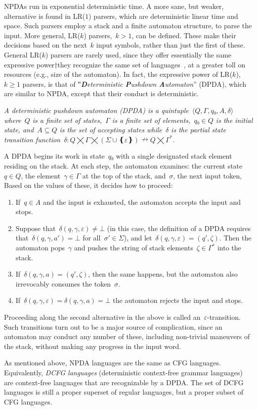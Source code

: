 NPDAs run in exponential deterministic time.
 A more sane, but weaker, alternative is found in LR($1$) parsers,
  which are deterministic linear time and space.
Such parsers employ a stack and a finite automaton structure,
  to parse the input.
 More general, LR($k$) parsers,~$k>1$, can be defined. These make their
 decisions based on the next~$k$ input symbols, rather than just the first of these.
 General LR($k$) parsers are rarely used, since they offer essentially
 the same expressive power†{they recognize the same set of languages~\cite{Knuth:65}},
 at a greater toll on resources (e.g., size of the automaton).
In fact, the expressive power of LR($k$),~$k\ge1$ parsers, is that
 of ‟\emph{\textbf Deterministic \textbf Pushdown \textbf Automaton}” (DPDA),
  which are similar to NPDA, except that their conduct is deterministic.

\begin{Definition}
  \label{Definition:DPDA}
  \slshape
  A \emph{deterministic pushdown automaton} (DPDA) is a quintuple~$⟨Q,Γ,q₀,A,δ⟩$
  where~$Q$ is a finite set of \emph{states},~$Γ$ is a finite
  \emph{set of elements},~$q₀∈Q$ is the initial state,
  and~$A⊆Q$ is the \emph{set of accepting states} while~$δ$ is
  the \emph{partial state transition function}~$δ:Q⨉Γ⨉(Σ∪❴ε❵)↛Q⨉Γ^*$.
  \par
  A DPDA begins its work in state~$q₀$ with a single designated stack element residing on the stack.
  At each step, the automaton examines: the current state~$q∈Q$, 
  the element~$γ∈Γ$ at the top of the stack, and~$σ$, the next input token, 
  Based on the values of these, it decides how to proceed:
  \begin{enumerate}
    \item If~$q∈A$ and the input is exhausted, the automaton accepts the input and stops.
    \item Suppose that~$δ(q,γ,ε)≠⊥$ (in this case, the definition of a DPDA
          requires that~$δ(q,γ,a')=⊥$ for all~$σ'∈Σ$), and let~$δ(q,γ,ε)=(q',ζ)$.
          Then the automaton pops~$γ$ and pushes the string of stack
          elements~$ζ∈Γ^*$ into the stack.
    \item If~$δ(q,γ,a)=(q',ζ)$, then the same happens, but the automaton also
          irrevocably consumes the token~$σ$.
    \item If~$δ(q,γ,ε)=δ(q,γ,a)=⊥$ the automaton rejects the input and stops.
  \end{enumerate}
\end{Definition}
Proceeding along the second alternative in the above is called an~$ε$-transition.
Such transitions turn out to be a major source of complication, 
  since an automaton may conduct any number of these, including non-trivial 
  maneuvers of the stack, without making any progress in the input word.
  
As mentioned above, NPDA languages are the same as CFG languages.
Equivalently, \emph{DCFG languages} (deterministic context-free grammar languages)
  are context-free languages that are recognizable by a DPDA.
The set of DCFG languages is still a proper superset of regular languages,
  but a proper subset of CFG languages.
